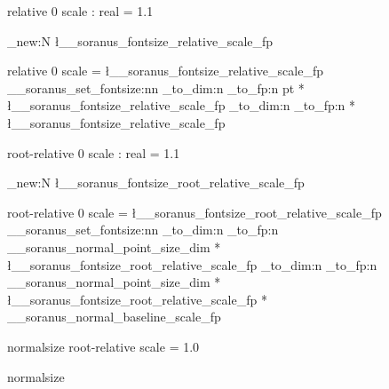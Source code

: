  { relative } { 0 }
  {
    scale : real = 1.1
  }


\fp_new:N \l__soranus_fontsize_relative_scale_fp

 { relative } { 0 }
  {
    scale = \l__soranus_fontsize_relative_scale_fp
  }
  {
    \__soranus_set_fontsize:nn
      {
        \fp_to_dim:n
          {
            \dim_to_fp:n { \f@size pt }
            * \l__soranus_fontsize_relative_scale_fp
          }
      }
      {
        \fp_to_dim:n
          {
            \dim_to_fp:n { \f@baselineskip }
            * \l__soranus_fontsize_relative_scale_fp
          }
      }
  }


%

 { root-relative } { 0 }
  {
    scale : real = 1.1
  }


\fp_new:N \l__soranus_fontsize_root_relative_scale_fp

 { root-relative } { 0 }
  {
    scale = \l__soranus_fontsize_root_relative_scale_fp
  }
  {
    \__soranus_set_fontsize:nn
      {
        \fp_to_dim:n
          {
            \dim_to_fp:n { \g__soranus_normal_point_size_dim }
            * \l__soranus_fontsize_root_relative_scale_fp
          }
      }
      {
        \fp_to_dim:n
          {
            \dim_to_fp:n { \g__soranus_normal_point_size_dim }
            * \l__soranus_fontsize_root_relative_scale_fp
            * \g__soranus_normal_baseline_scale_fp
          }
      }
  }


%

 { normalsize } { root-relative }
  {
    scale = 1.0
  }

\RenewDocumentCommand \normalsize { }
  {  { normalsize } }
